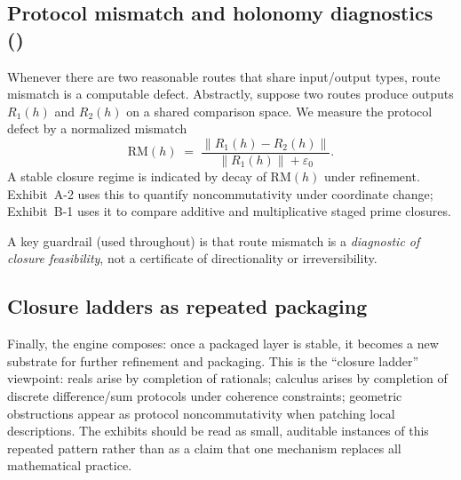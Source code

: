 \subsection{Protocol mismatch and holonomy diagnostics (\Pthree)}
Whenever there are two reasonable routes that share input/output types, route mismatch is a computable defect.
Abstractly, suppose two routes produce outputs $R_1(h)$ and $R_2(h)$ on a shared comparison space.
We measure the protocol defect by a normalized mismatch
\[
\mathrm{RM}(h)
\;=\;
\frac{\|R_1(h)-R_2(h)\|}{\|R_1(h)\|+\varepsilon_0}.
\]
A stable closure regime is indicated by decay of $\mathrm{RM}(h)$ under refinement.
Exhibit~A-2 uses this to quantify noncommutativity under coordinate change; Exhibit~B-1 uses it to compare additive and multiplicative staged prime closures.

A key guardrail (used throughout) is that route mismatch is a \emph{diagnostic of closure feasibility}, not a certificate of directionality or irreversibility.

\subsection{Closure ladders as repeated packaging}
Finally, the engine composes: once a packaged layer is stable, it becomes a new substrate for further refinement and packaging.
This is the \SBT ``closure ladder'' viewpoint:
reals arise by completion of rationals; calculus arises by completion of discrete difference/sum protocols under coherence constraints; geometric obstructions appear as protocol noncommutativity when patching local descriptions.
The exhibits should be read as small, auditable instances of this repeated pattern rather than as a claim that one mechanism replaces all mathematical practice.
